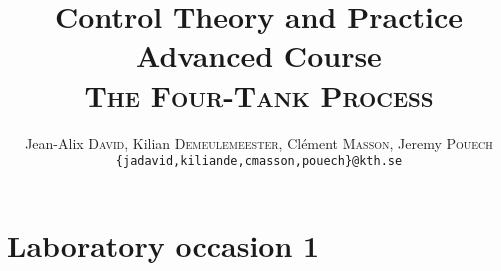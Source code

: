 \documentclass[a4paper,8pt,twocolumn]{extarticle}
\title{Control Theory and Practice \\ Advanced Course \\ \textsc{The Four-Tank Process}}
\author{Jean-Alix \textsc{David}, Kilian \textsc{Demeulemeester}, Clément \textsc{Masson}, Jeremy \textsc{Pouech} \\ \texttt{\{jadavid,kiliande,cmasson,pouech\}@kth.se}}
\begin{document}
\setlength\parindent{0em}

\maketitle




\section{Laboratory occasion 1}



% 
% 
% 
% 
% 
% 
% 
% 
% 
% 
% 
\end{document}
